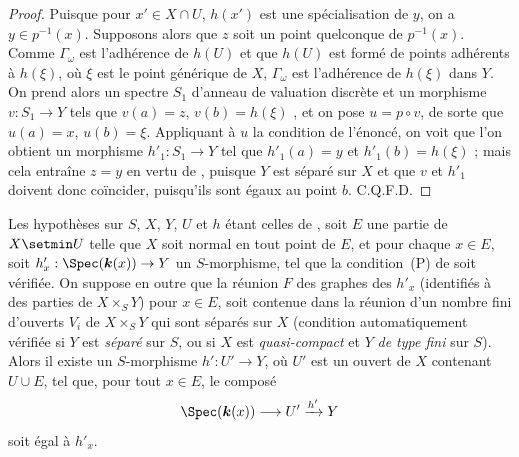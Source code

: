 \begin{proof}
Puisque pour $x'\in X\cap U$, $h(x')$ est une spécialisation de $y$, on a $y\in p^{-1}(x)$.
Supposons alors que $z$ soit un point quelconque de $p^{-1}(x)$.
Comme $\Gamma_\omega$ est l'adhérence de $h(U)$ et que $h(U)$ est formé de points adhérents à $h(\xi)$, où $\xi$ est le point générique de $X$, $\Gamma_\omega$ est l'adhérence de $h(\xi)$ dans $Y$.
On prend alors un spectre $S_1$ d'anneau de valuation discrète et un morphisme $v:S_1\to Y$ tels que $v(a)=z$, $v(b)=h(\xi)$ , et on pose $u=p\circ v$, de sorte que $u(a)=x$, $u(b)=\xi$.
Appliquant à $u$ la condition de l'énoncé, on voit que l'on obtient un morphisme $h'_1:S_1\to Y$ tel que $h'_1(a)=y$ et $h'_1(b)=h(\xi)$ ; mais cela entraîne $z=y$ en vertu de , puisque $Y$ est séparé sur $X$ et que $v$ et $h'_1$ doivent donc coïncider, puisqu'ils sont égaux au point $b$.
C.Q.F.D.
\end{proof}

\begin{corollary}[20.4.7]
Les hypothèses sur $S$, $X$, $Y$, $U$ et $h$ étant celles de , soit $E$ une partie de $X\setmin U$ telle que $X$ soit \textup{normal} en tout point de $E$, et pour chaque $x\in E$, soit $h'_x:\Spec(\boldsymbol{k}(x))\to Y$ un $S$-morphisme, tel que la condition~\textup{(P)} de  soit vérifiée.
On suppose en outre que la réunion $F$ des graphes des $h'_x$ (identifiés à des parties de $X\times_S Y$) pour $x\in E$, soit contenue dans la réunion d'un nombre \textup{fini} d'ouverts $V_i$ de $X\times_S Y$ qui sont séparés sur $X$ \textup{(condition automatiquement vérifiée si $Y$ est \emph{séparé} sur $S$, ou si $X$ est \emph{quasi-compact} et $Y$ \emph{de type fini} sur $S$)}.
Alors il existe un $S$-morphisme $h':U'\to Y$, où $U'$ est un ouvert de $X$ contenant $U\cup E$, tel que, pour tout $x\in E$, le composé
\[
  \Spec(\boldsymbol{k}(x))\to U'\xrightarrow{h'}Y
\]
soit égal à $h'_x$.
\end{corollary}

